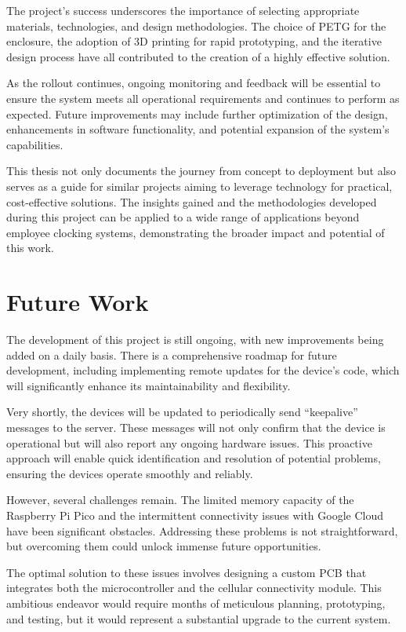 The project's success underscores the importance of selecting appropriate materials, technologies, 
and design methodologies. The choice of PETG for the enclosure, the adoption of 3D printing for 
rapid prototyping, and the iterative design process have all contributed to the creation of a 
highly effective solution.

As the rollout continues, ongoing monitoring and feedback will be essential to ensure the system 
meets all operational requirements and continues to perform as expected. Future improvements may 
include further optimization of the design, enhancements in software functionality, and potential 
expansion of the system's capabilities.

This thesis not only documents the journey from concept to deployment but also serves as a guide 
for similar projects aiming to leverage technology for practical, cost-effective solutions. The 
insights gained and the methodologies developed during this project can be applied to a wide range 
of applications beyond employee clocking systems, demonstrating the broader impact and potential 
of this work.


\section{Future Work}

The development of this project is still ongoing, with new improvements being added on a daily 
basis. There is a comprehensive roadmap for future development, including implementing remote 
updates for the device's code, which will significantly enhance its maintainability and 
flexibility.

Very shortly, the devices will be updated to periodically send ``keepalive'' messages to the server. 
These messages will not only confirm that the device is operational but will also report any 
ongoing hardware issues. This proactive approach will enable quick identification and resolution 
of potential problems, ensuring the devices operate smoothly and reliably.

However, several challenges remain. The limited memory capacity of the Raspberry Pi Pico and the 
intermittent connectivity issues with Google Cloud have been significant obstacles. Addressing 
these problems is not straightforward, but overcoming them could unlock immense future 
opportunities.

The optimal solution to these issues involves designing a custom PCB that integrates both the 
microcontroller and the cellular connectivity module. This ambitious endeavor would require months 
of meticulous planning, prototyping, and testing, but it would represent a substantial upgrade to 
the current system.

